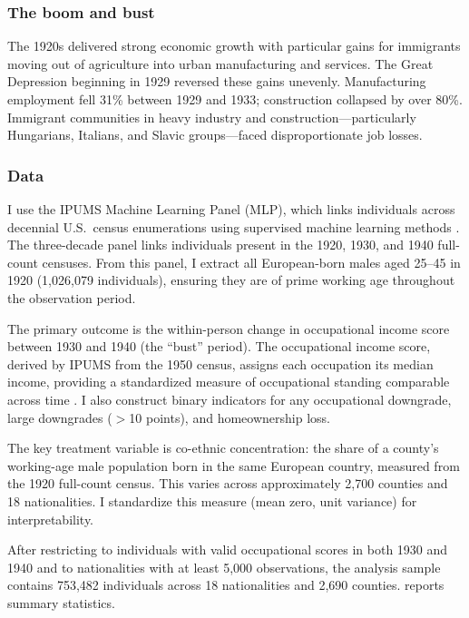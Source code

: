 \documentclass[12pt]{article}
\begin{document}
\subsubsection*{The boom and bust} The 1920s delivered strong economic growth with particular gains for immigrants moving out of agriculture into urban manufacturing and services. The Great Depression beginning in 1929 reversed these gains unevenly. Manufacturing employment fell 31\% between 1929 and 1933; construction collapsed by over 80\%. Immigrant communities in heavy industry and construction---particularly Hungarians, Italians, and Slavic groups---faced disproportionate job losses.

\subsubsection*{Data} I use the IPUMS Machine Learning Panel (MLP), which links individuals across decennial U.S.\ census enumerations using supervised machine learning methods \citep{helgertz2023,price2023}. The three-decade panel links individuals present in the 1920, 1930, and 1940 full-count censuses. From this panel, I extract all European-born males aged 25--45 in 1920 (1,026,079 individuals), ensuring they are of prime working age throughout the observation period.

The primary outcome is the within-person change in occupational income score between 1930 and 1940 (the ``bust'' period). The occupational income score, derived by IPUMS from the 1950 census, assigns each occupation its median income, providing a standardized measure of occupational standing comparable across time \citep{sobek1996}. I also construct binary indicators for any occupational downgrade, large downgrades ($>$10 points), and homeownership loss.

The key treatment variable is co-ethnic concentration: the share of a county's working-age male population born in the same European country, measured from the 1920 full-count census. This varies across approximately 2,700 counties and 18 nationalities. I standardize this measure (mean zero, unit variance) for interpretability.

After restricting to individuals with valid occupational scores in both 1930 and 1940 and to nationalities with at least 5,000 observations, the analysis sample contains 753,482 individuals across 18 nationalities and 2,690 counties.  reports summary statistics.


\end{document}
